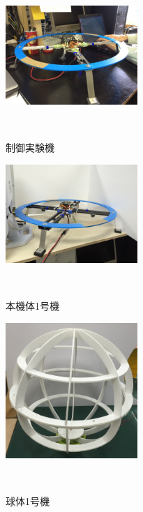 \documentclass[a4paper]{jarticle}
\begin{document}
\begin{figure}[b]
 \begin{center}
  \includegraphics[width=50mm]{image/test-machine.JPG}
 　\caption{制御実験機}
 　\label{fig:test-machine}
 \end{center}
\end{figure}

\begin{figure}[b]
 \begin{center}
  \includegraphics[width=50mm]{image/drone-4.JPG}
 　\caption{本機体1号機}
 　\label{fig:drone-4}
 \end{center}
\end{figure}

\begin{figure}[b]
 \begin{center}
  \includegraphics[width=50mm]{image/sphere-1.JPG}
 　\caption{球体1号機}
 　\label{fig:sphere-1}
 \end{center}
\end{figure}
\end{document}
